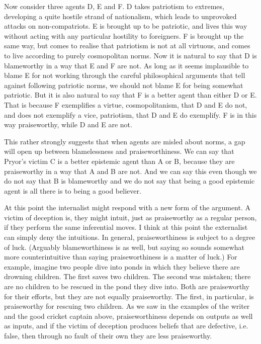 Now consider three agents D, E and F. D takes patriotism to extremes, developing a quite hostile strand of nationalism, which leads to unprovoked attacks on non-compatriots. E is brought up to be patriotic, and lives this way without acting with any particular hostility to foreigners. F is brought up the same way, but comes to realise that patriotism is not at all virtuous, and comes to live according to purely cosmopolitan norms. Now it is natural to say that D is blameworthy in a way that E and F are not. As long as it seems implausible to blame E for not working through the careful philosophical arguments that tell against following patriotic norms, we should not blame E for being somewhat patriotic. But it is also natural to say that F is a better agent than either D or E. That is because F exemplifies a virtue, cosmopolitanism, that D and E do not, and does not exemplify a vice, patriotism, that D and E do exemplify. F is in this way praiseworthy, while D and E are not.

This rather strongly suggests that when agents are misled about norms, a gap will open up between blamelessness and praiseworthiness. We can say that Pryor's victim C is a better epistemic agent than A or B, because they are praiseworthy in a way that A and B are not. And we can say this even though we do not say that B is blameworthy and we do not say that being a good epistemic agent is all there is to being a good believer.

At this point the internalist might respond with a new form of the argument. A victim of deception is, they might intuit, just as praiseworthy as a regular person, if they perform the same inferential moves. I think at this point the externalist can simply deny the intuitions. In general, praiseworthiness is subject to a degree of luck. (Arguably blameworthiness is as well, but saying so sounds somewhat more counterintuitive than saying praiseworthiness is a matter of luck.) For example, imagine two people dive into ponds in which they believe there are drowning children. The first saves two children. The second was mistaken; there are no children to be rescued in the pond they dive into. Both are praiseworthy for their efforts, but they are not equally praiseworthy. The first, in particular, is praiseworthy for rescuing two children. As we saw in the examples of the writer and the good cricket captain above, praiseworthiness depends on outputs as well as inputs, and if the victim of deception produces beliefs that are defective, i.e. false, then through no fault of their own they are less praiseworthy.


